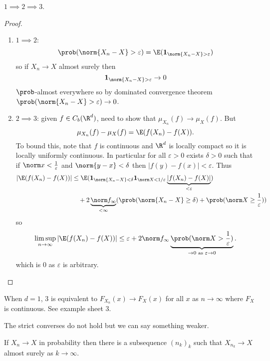 \documentclass[a4paper]{article}
\renewcommand{\P}{\prob} %
\begin{document}
\begin{proposition}
  \(1 \implies 2 \implies 3\).
\end{proposition}

\begin{proof}\leavevmode
  \begin{enumerate}
  \item \(1 \implies 2\):
    \[
      \P(\norm{X_n - X} > \varepsilon) = \E(\mathbf 1_{\norm{X_n - X} > \varepsilon})
    \]
    so if \(X_n \to X\) almost surely then
    \[
      \mathbf 1_{\norm{X_n - X} > \varepsilon} \to 0
    \]
    \(\P\)-almost everywhere so by dominated convergence theorem \(\P(\norm{X_n - X} > \varepsilon) \to 0\).
  \item \(2 \implies 3\): given \(f \in C_b(\R^d)\), need to show that \(\mu_{X_n}(f) \to \mu_X(f)\). But
    \[
      \mu_{X_n}(f) - \mu_X(f) = \E(f(X_n) - f(X)).
    \]
    To bound this, note that \(f\) is continuous and \(\R^d\) is locally compact so it is locally uniformly continuous. In particular for all \(\varepsilon > 0\) exists \(\delta > 0\) such that if \(\norm x < \frac{1}{\varepsilon}\) and \(\norm{y - x} < \delta\) then \(|f(y) - f(x)| < \varepsilon\). Thus
    \begin{align*}
      |\E(f(X_n)  - f(X))|
      &\leq \E(\mathbf 1_{\norm{X_n - X} < \delta} \mathbf 1_{\norm X < 1/\varepsilon} \underbrace{|f(X_n) - f(X)|}_{< \varepsilon}) \\
      &\quad + 2 \underbrace{\norm f_\infty}_{< \infty} (\P(\norm{X_n - X} \geq \delta) + \P(\norm X \geq \frac{1}{\varepsilon}))
    \end{align*}
    so
    \[
      \limsup_{n \to \infty} |\E(f(X_n)  - f(X))|
      \leq \varepsilon + 2 \norm f_\infty \underbrace{\P(\norm X > \frac{1}{\varepsilon})}_{\to 0 \text{ as } \varepsilon \to 0}.
    \]
    which is \(0\) as \(\varepsilon\) is arbitrary.
  \end{enumerate}
\end{proof}

\begin{remark}
  When \(d = 1\), 3 is equivalent to \(F_{X_n}(x) \to F_X(x)\) for all \(x\) as \(n \to \infty\) where \(F_X\) is continuous. See example sheet 3.
\end{remark}

The strict converses do not hold but we can say something weaker.

\begin{proposition}
  If \(X_n \to X\) in probability then there is a subsequence \((n_k)_k\) such that \(X_{n_k} \to X\) almost surely as \(k \to \infty\).
\end{proposition}
\end{document}
